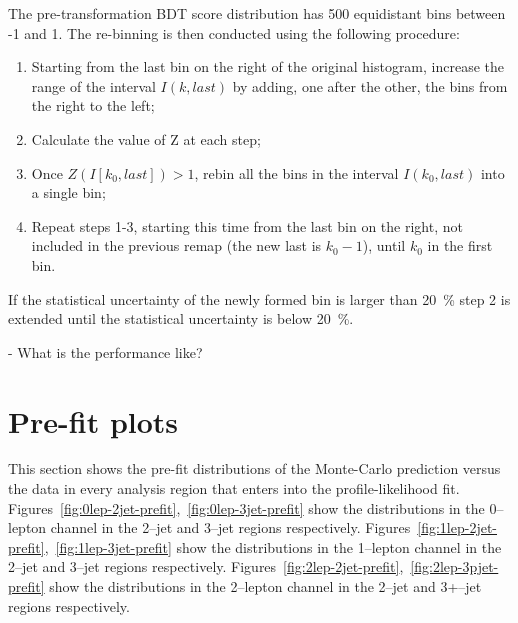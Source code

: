 
The pre-transformation BDT score distribution has 500 equidistant bins between
-1 and 1. The re-binning is then conducted using the following procedure:
\begin{enumerate}
\item Starting from the last bin on the right of the original histogram,
  increase the range of the interval $I(k, last)$ by adding, one after the other,
  the bins from the right to the left;
\item Calculate the value of Z at each step;
\item Once $Z(I[k_{0}, last]) > 1$, rebin all the bins in the interval $I(k_{0},
  last)$ into a single bin;
\item Repeat steps 1-3, starting this time from the last bin on the right, not
  included in the previous remap (the new last is $k_{0}-1$), until $k_{0}$ in
  the first bin.
\end{enumerate}
If the statistical uncertainty of the newly formed bin is larger than 20~\% step
2 is extended until the statistical uncertainty is below 20~\%.

- What is the performance like?

\section{Pre-fit plots}
\label{sec:prefit}

This section shows the pre-fit distributions of the Monte-Carlo prediction
versus the data in every analysis region that enters into the profile-likelihood
fit. Figures~\ref{fig:0lep-2jet-prefit},~\ref{fig:0lep-3jet-prefit} show the
distributions in the 0--lepton channel in the 2--jet and 3--jet regions
respectively. Figures~\ref{fig:1lep-2jet-prefit},~\ref{fig:1lep-3jet-prefit} show the
distributions in the 1--lepton channel in the 2--jet and 3--jet regions
respectively. Figures~\ref{fig:2lep-2jet-prefit},~\ref{fig:2lep-3pjet-prefit} show the
distributions in the 2--lepton channel in the 2--jet and 3+--jet regions
respectively.







